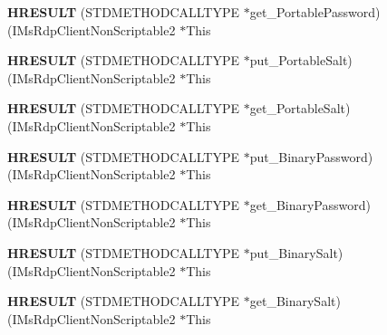 \begin{DoxyCompactItemize}
\item 
\mbox{\label{struct_i_ms_rdp_client_non_scriptable2_vtbl_a2c137807082120992b1aef9edd1c362f}} 
{\bfseries H\+R\+E\+S\+U\+LT} (S\+T\+D\+M\+E\+T\+H\+O\+D\+C\+A\+L\+L\+T\+Y\+PE $\ast$get\+\_\+\+Portable\+Password)(I\+Ms\+Rdp\+Client\+Non\+Scriptable2 $\ast$This
\item 
\mbox{\label{struct_i_ms_rdp_client_non_scriptable2_vtbl_ae2441a0a9beb1bd24494a9e4cc5f6ff2}} 
{\bfseries H\+R\+E\+S\+U\+LT} (S\+T\+D\+M\+E\+T\+H\+O\+D\+C\+A\+L\+L\+T\+Y\+PE $\ast$put\+\_\+\+Portable\+Salt)(I\+Ms\+Rdp\+Client\+Non\+Scriptable2 $\ast$This
\item 
\mbox{\label{struct_i_ms_rdp_client_non_scriptable2_vtbl_a1756904b65f387711d2c73a6aa93a670}} 
{\bfseries H\+R\+E\+S\+U\+LT} (S\+T\+D\+M\+E\+T\+H\+O\+D\+C\+A\+L\+L\+T\+Y\+PE $\ast$get\+\_\+\+Portable\+Salt)(I\+Ms\+Rdp\+Client\+Non\+Scriptable2 $\ast$This
\item 
\mbox{\label{struct_i_ms_rdp_client_non_scriptable2_vtbl_a3dc1c71fb85effbc750836e9ae408b5c}} 
{\bfseries H\+R\+E\+S\+U\+LT} (S\+T\+D\+M\+E\+T\+H\+O\+D\+C\+A\+L\+L\+T\+Y\+PE $\ast$put\+\_\+\+Binary\+Password)(I\+Ms\+Rdp\+Client\+Non\+Scriptable2 $\ast$This
\item 
\mbox{\label{struct_i_ms_rdp_client_non_scriptable2_vtbl_a1515b450fc141b4a19cb3d549a60c8d4}} 
{\bfseries H\+R\+E\+S\+U\+LT} (S\+T\+D\+M\+E\+T\+H\+O\+D\+C\+A\+L\+L\+T\+Y\+PE $\ast$get\+\_\+\+Binary\+Password)(I\+Ms\+Rdp\+Client\+Non\+Scriptable2 $\ast$This
\item 
\mbox{\label{struct_i_ms_rdp_client_non_scriptable2_vtbl_a8d28a417baf513213c4d5d5e3f5495aa}} 
{\bfseries H\+R\+E\+S\+U\+LT} (S\+T\+D\+M\+E\+T\+H\+O\+D\+C\+A\+L\+L\+T\+Y\+PE $\ast$put\+\_\+\+Binary\+Salt)(I\+Ms\+Rdp\+Client\+Non\+Scriptable2 $\ast$This
\item 
\mbox{\label{struct_i_ms_rdp_client_non_scriptable2_vtbl_a0a56d2b45606b137ef927b12a217a95a}} 
{\bfseries H\+R\+E\+S\+U\+LT} (S\+T\+D\+M\+E\+T\+H\+O\+D\+C\+A\+L\+L\+T\+Y\+PE $\ast$get\+\_\+\+Binary\+Salt)(I\+Ms\+Rdp\+Client\+Non\+Scriptable2 $\ast$This

\end{DoxyCompactItemize}
